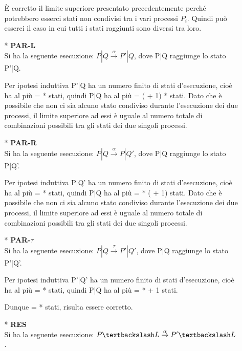 \begin{itemize}
\begin{itemize}
		È corretto il limite superiore presentato precedentemente perché potrebbero esserci stati non condivisi tra i vari processi $P_{i}$. Quindi può esserci il caso in cui tutti i stati raggiunti sono diversi tra loro.
		\\
		\item[*] \textbf{PAR-L}
		\\
		Si ha la seguente esecuzione: $P|Q \overset{\alpha}\rightarrow P'|Q$, dove P|Q raggiunge lo stato P'|Q.
		
		Per ipotesi induttiva P'|Q ha un numero finito di stati d'esecuzione, cioè ha al più  =  *  stati, quindi P|Q ha al più  = ( + 1) *  stati. Dato che è possibile che non ci sia alcuno stato condiviso durante l'esecuzione dei due processi, il limite superiore ad essi è uguale al numero totale di combinazioni possibili tra gli stati dei due singoli processi.	
		\\
		\item[*] \textbf{PAR-R}
		\\
		Si ha la seguente esecuzione: $P|Q \overset{\alpha}\rightarrow P|Q'$, dove P|Q raggiunge lo stato P|Q'.
		
		Per ipotesi induttiva P|Q' ha un numero finito di stati d'esecuzione, cioè ha al più  =  *  stati, quindi P|Q ha al più  =  * ( + 1) stati. Dato che è possibile che non ci sia alcuno stato condiviso durante l'esecuzione dei due processi, il limite superiore ad essi è uguale al numero totale di combinazioni possibili tra gli stati dei due singoli processi.
		\\
		\item[*] \textbf{PAR-$\tau$}
		\\
		Si ha la seguente esecuzione: $P|Q \overset{\tau}\rightarrow P'|Q'$, dove P|Q raggiunge lo stato P'|Q'.
		
		Per ipotesi induttiva P'|Q' ha un numero finito di stati d'esecuzione, cioè ha al più  =  *  stati, quindi P|Q ha al più  =  *  + 1 stati.
		
		Dunque  =  *  stati, risulta essere corretto.
		\\
		\item[*] \textbf{RES}
		\\
		Si ha la seguente esecuzione: $P \textbackslash L \overset{\alpha}\rightarrow P' \textbackslash L$. 
		

\end{itemize}
\end{itemize}
